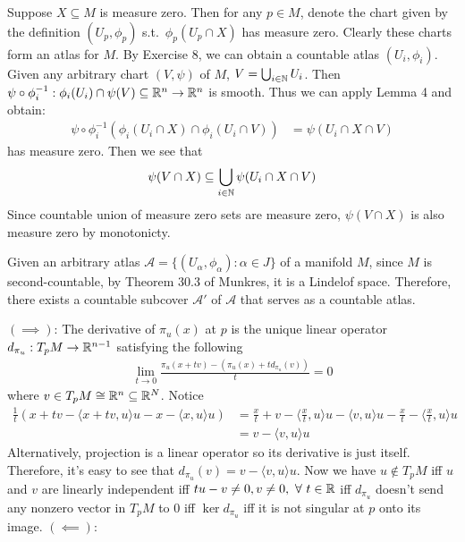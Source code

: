 \documentclass[12pt]{article}
\begin{document}
\begin{problem}[8.5]
Suppose $ X \subseteq M$ is measure zero. Then for any $ p \in M$, denote the chart given by the definition $ (U_p, \phi_p)$ s.t.\ $ \phi_p(U_p \cap X)$ has measure zero. Clearly these charts form an atlas for $ M$. By Exercise 8, we can obtain a countable atlas  $ (U_i,\phi_i)$. Given any arbitrary chart $(V,\psi) $ of $ M$, $ V = \bigcup_{ i \in \mathbb{N}} U_i$. Then $ \psi \circ \phi_i ^{-1}: \phi_i(U_i) \cap \psi(V) \subseteq \mathbb{R}^{n} \to \mathbb{R}^{n}$ is smooth. Thus we can apply Lemma 4 and obtain:
\begin{align*}
	 \psi \circ \phi_i ^{-1} (\phi_i(U_i \cap X) \cap \phi_i(U_i \cap V)) &= \psi (U_i \cap X \cap V) 
\end{align*}
has measure zero. Then we see that
\begin{align*}
	\psi(V \cap X) \subseteq \bigcup_{ i \in \mathbb{N}} \psi(U_i \cap X \cap V) 
\end{align*}
Since countable union of measure zero sets are measure zero, $ \psi(V \cap X)$ is also measure zero by monotonicty.
\end{problem}
\begin{problem}[8.8]
	Given an arbitrary atlas $ \mathcal{ A} = \{(U_{ \alpha}, \phi_{ \alpha}): \alpha \in J\} $ of a manifold $M$, since $ M$ is second-countable, by Theorem 30.3 of Munkres, it is a Lindelof space. Therefore, there exists a countable subcover $ \mathcal{ A'}$ of $ \mathcal{ A}$ that serves as a countable atlas.
\end{problem}
\begin{problem}[8.11]
$ (\implies)$: The derivative of $ \pi_u(x)$ at $ p$ is the unique linear operator $ d_{\pi_u}: T_p M \to \mathbb{R}^{n-1}$ satisfying the following
\begin{align*}
	\lim_{ t \to 0} \frac{\pi_u(x+tv) -(\pi_u(x)+ td_{\pi_u}(v))}{ t} = 0
\end{align*}
where $ v \in T_pM \cong \mathbb{R}^{n} \subseteq \mathbb{R}^{N}$. Notice
\begin{align*}
	\frac{1}{t}(x+tv - \langle x+tv,u \rangle u - x - \langle x,u \rangle u ) &= \frac{x}{t}+v- \langle \frac{x}{t},u \rangle u - \langle v,u \rangle u - \frac{x}{t} -\langle \frac{x}{t},u \rangle u \\
	&= v- \langle v,u \rangle u 
\end{align*}
Alternatively, projection is a linear operator so its derivative is just itself. Therefore, it's easy to see that $ d_{\pi_u}(v) = v- \langle v,u \rangle u$. Now we have $ u \not\in T_pM$ iff $ u$ and  $ v$ are linearly independent iff $ t u -v \neq 0 , v \neq 0, \ \forall \ t \in \mathbb{R}$ iff $ d_{\pi_u}$ doesn't send any nonzero vector in $ T_pM$ to 0 iff $ \ker d_{\pi_u}$ iff it is not singular at $ p$ onto its image.
$ (\impliedby):$ 
\end{problem}
\end{document}
